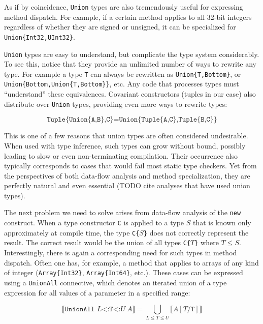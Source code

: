 As if by coincidence, \texttt{Union} types are also tremendously useful for expressing
method dispatch. For example, if a certain method applies to all 32-bit integers regardless
of whether they are signed or unsigned, it can be specialized for \texttt{Union\{Int32,UInt32\}}.

\texttt{Union} types are easy to understand, but complicate the type system considerably.
To see this, notice that they provide an unlimited number of ways to rewrite any type.
For example a type \texttt{T} can always be rewritten as \texttt{Union\{T,Bottom\}}, or
\texttt{Union\{Bottom,Union\{T,Bottom\}\}}, etc. Any code that processes types must
``understand'' these equivalences. Covariant constructors (tuples in our case)
also distribute over \texttt{Union} types, providing even more ways to rewrite types:

\[
\texttt{Tuple\{Union\{A,B\},C\}} = \texttt{Union\{Tuple\{A,C\},Tuple\{B,C\}\}}
\]

This is one of a few reasons that union types are often considered undesirable.
When used with type inference, such types can grow without bound, possibly leading
to slow or even non-terminating compilation. Their occurrence also typically
corresponds to cases that would fail most static type checkers. Yet from the
perspectives of both data-flow analysis and method specialization, they are
perfectly natural and even essential \cite{Igarashi} \cite{Smith:2008:JTI:1449764.1449804}
(TODO cite analyses that have used union types).

The next problem we need to solve arises from data-flow analysis of
the \texttt{new} construct.
When a type constructor \texttt{C} is applied to a type
$S$ that is known only approximately at compile time, the type \texttt{C\{}$S$\texttt{\}}
does not correctly represent the result.
The correct result would be the union of all types \texttt{C\{}$T$\texttt{\}}
where $T\leq S$.
Interestingly, there is again a corresponding need for such types in method
dispatch. Often one has, for example, a method that applies to arrays of any
kind of integer (\texttt{Array\{Int32\}}, \texttt{Array\{Int64\}}, etc.).
These cases can be expressed using a \texttt{UnionAll} connective, which denotes
an iterated union of a type expression for all values of a parameter in a specified
range:

\[
  \llbracket \texttt{UnionAll }L\texttt{<:T<:}U\ A \rrbracket = \bigcup_{L \leq T \leq U} \llbracket A[T/\texttt{T}] \rrbracket
\]



